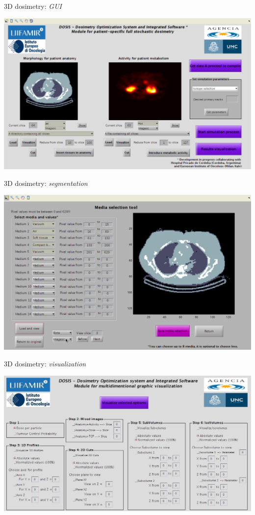 \documentclass[ignorenonframetext,]{beamer}
\begin{document}
\begin{frame}{3D dosimetry: \emph{GUI}}
\protect\hypertarget{d-dosimetry-gui}{}

\includegraphics{imgs/3d-main.png}

\end{frame}

\begin{frame}{3D dosimetry: \emph{segmentation}}
\protect\hypertarget{d-dosimetry-segmentation}{}

\includegraphics{imgs/3d-segmentation.png}

\end{frame}

\begin{frame}{3D dosimetry: \emph{visualization}}
\protect\hypertarget{d-dosimetry-visualization}{}

\includegraphics{imgs/3d-viz.jpg}

\end{frame}
\end{document}
